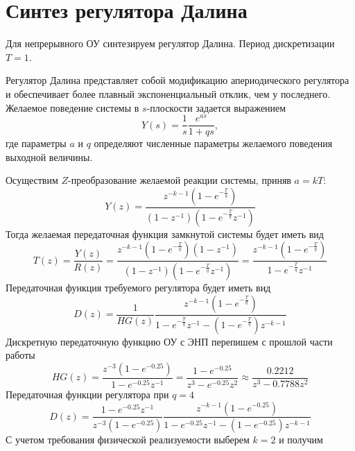 \chapter{Синтез регулятора Далина}
\label{ch:chap2}
Для непрерывного ОУ синтезируем регулятор Далина. Период дискретизации $T=1$.

Регулятор Далина представляет собой модификацию апериодического регулятора и обеспечивает более плавный экспоненциальный отклик, чем у последнего. Желаемое поведение системы в $s$-плоскости задается выражением
\begin{equation}
	Y(s) = \frac{1}{s} \frac{e^{as}}{1 + qs},
\end{equation}
где параметры $a$ и $q$ определяют численные параметры желаемого поведения выходной величины.

Осуществим $Z$-преобразование желаемой реакции системы, приняв $a=kT$:
\begin{equation}
	Y(z) = \frac{z^{-k-1} \left(1 - e^{-\frac{T}{q}}\right)}{\left(1 - z^{-1}\right) \left(1-e^{-\frac{T}{q}}z^{-1}\right)}
\end{equation}
Тогда желаемая передаточная функция замкнутой системы будет иметь вид
\begin{equation}
	T(z) = \frac{Y(z)}{R(z)} = \frac{z^{-k-1} \left(1 - e^{-\frac{T}{q}}\right) \left(1-z^{-1}\right)}{\left(1-z^{-1}\right) \left(1-e^{-\frac{T}{q}}z^{-1}\right)} = \frac{z^{-k-1} \left(1-e^{-\frac{T}{q}}\right)}{1 - e^{-\frac{T}{q}}z^{-1}}
\end{equation}
Передаточная функция требуемого регулятора будет иметь вид
\begin{equation}
	D(z) = \frac{1}{HG(z)} \frac{z^{-k-1} \left(1-e^{-\frac{T}{q}}\right)}{1-e^{-\frac{T}{q}}z^{-1} -\left(1-e^{-\frac{T}{q}}\right)z^{-k-1}}
\end{equation}
Дискретную передаточную функцию ОУ с ЭНП перепишем с прошлой части работы
\begin{equation}
	HG(z) =
	\frac{z^{-3} \left(1 - e^{-0.25}\right)}{1 - e^{-0.25} z^{-1}} = \frac{1 - e^{-0.25}}{z^3 - e^{-0.25} z^{2}} \approx
	\frac{0.2212}{z^3 - 0.7788z^2}
\end{equation}
Передаточная функции регулятора при $q = 4$
\begin{equation}
	D(z) = \frac{1 - e^{-0.25} z^{-1}}{z^{-3} \left(1 - e^{-0.25}\right)} \frac{z^{-k-1} \left(1-e^{-0.25}\right)}{1-e^{-0.25}z^{-1} -\left(1-e^{-0.25}\right)z^{-k-1}}
\end{equation}
С учетом требования физической реализуемости выберем $k = 2$ и получим
